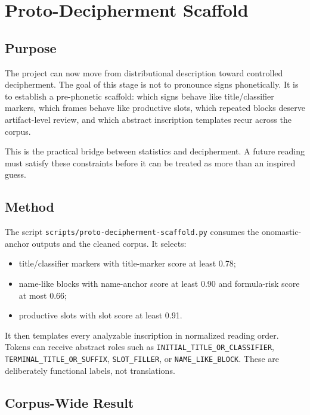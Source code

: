 \section{Proto-Decipherment Scaffold}

\subsection{Purpose}

The project can now move from distributional description toward controlled decipherment. The goal of this stage is not to pronounce signs phonetically. It is to establish a pre-phonetic scaffold: which signs behave like title/classifier markers, which frames behave like productive slots, which repeated blocks deserve artifact-level review, and which abstract inscription templates recur across the corpus.

This is the practical bridge between statistics and decipherment. A future reading must satisfy these constraints before it can be treated as more than an inspired guess.

\subsection{Method}

The script \texttt{scripts/proto-decipherment-scaffold.py} consumes the onomastic-anchor outputs and the cleaned corpus. It selects:

\begin{itemize}
  \item title/classifier markers with title-marker score at least 0.78;
  \item name-like blocks with name-anchor score at least 0.90 and formula-risk score at most 0.66;
  \item productive slots with slot score at least 0.91.
\end{itemize}

It then templates every analyzable inscription in normalized reading order. Tokens can receive abstract roles such as \texttt{INITIAL\_TITLE\_OR\_CLASSIFIER}, \texttt{TERMINAL\_TITLE\_OR\_SUFFIX}, \texttt{SLOT\_FILLER}, or \texttt{NAME\_LIKE\_BLOCK}. These are deliberately functional labels, not translations.

\subsection{Corpus-Wide Result}

